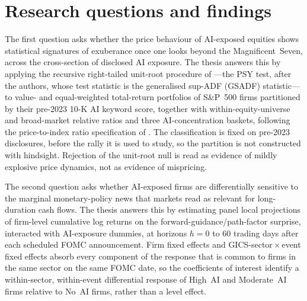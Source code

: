\section{Research questions and findings}
\label{sec:intro-rq}

The first question asks whether the price behaviour of
AI-exposed equities shows statistical signatures of exuberance
once one looks beyond the Magnificent~Seven, across the
cross-section of disclosed AI exposure. The thesis answers this
by applying the recursive right-tailed unit-root procedure of
\citet{phillipsShiYu2015a}---the PSY test, after the authors,
whose test statistic is the generalised sup-ADF (GSADF)
statistic---to value- and equal-weighted total-return
portfolios of S\&P~500 firms partitioned by their pre-2023 10-K
AI keyword score, together with within-equity-universe and
broad-market relative ratios and three AI-concentration baskets,
following the price-to-index ratio specification of
\citet{baselePhillipsShi2025}. The classification is fixed on
pre-2023 disclosures, before the rally it is used to study, so
the partition is not constructed with hindsight. Rejection of
the unit-root null is read as evidence of mildly explosive price
dynamics, not as evidence of mispricing.

The second question asks whether AI-exposed firms are
differentially sensitive to the marginal monetary-policy news
that markets read as relevant for long-duration cash flows. The
thesis answers this by estimating panel local projections
\citep{jorda2005} of firm-level cumulative log returns on the
\citet{swanson2021} forward-guidance/path-factor surprise,
interacted with AI-exposure dummies, at horizons $h = 0$ to
$60$ trading days after each scheduled FOMC announcement.
Firm fixed effects and GICS-sector\,$\times$\,event fixed
effects absorb every component of the response that is common
to firms in the same sector on the same FOMC date, so the
coefficients of interest identify a within-sector, within-event
differential response of High~AI and Moderate~AI firms relative
to No~AI firms, rather than a level effect.



